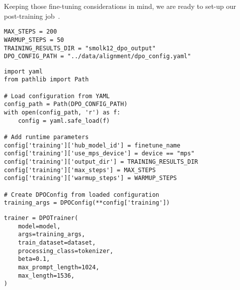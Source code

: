 Keeping those fine-tuning considerations in mind, we are ready to set-up our post-training job~.
\begin{verbatim}
MAX_STEPS = 200
WARMUP_STEPS = 50
TRAINING_RESULTS_DIR = "smolk12_dpo_output"
DPO_CONFIG_PATH = "../data/alignment/dpo_config.yaml"
\end{verbatim}

\begin{verbatim}
import yaml
from pathlib import Path

# Load configuration from YAML
config_path = Path(DPO_CONFIG_PATH)
with open(config_path, 'r') as f:
    config = yaml.safe_load(f)

# Add runtime parameters
config['training']['hub_model_id'] = finetune_name
config['training']['use_mps_device'] = device == "mps"
config['training']['output_dir'] = TRAINING_RESULTS_DIR
config['training']['max_steps'] = MAX_STEPS
config['training']['warmup_steps'] = WARMUP_STEPS

# Create DPOConfig from loaded configuration
training_args = DPOConfig(**config['training'])
\end{verbatim}

\begin{verbatim}
trainer = DPOTrainer(
    model=model,
    args=training_args,
    train_dataset=dataset,
    processing_class=tokenizer,
    beta=0.1,
    max_prompt_length=1024,
    max_length=1536,
)
\end{verbatim}

